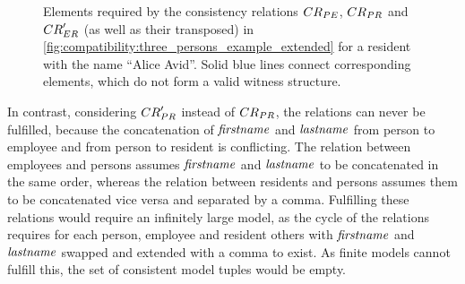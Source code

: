 \begin{figure}
    \centering
    
    \caption[Example for an intuitive notion of incompatibility]{Elements required by the consistency relations $\consistencyrelation{CR}{PE}$, $\consistencyrelation{CR}{PR}$ and $\consistencyrelation{CR}{ER}'$ (as well as their transposed) in \autoref{fig:compatibility:three_persons_example_extended} for a resident with the name \enquote{Alice Avid}. Solid blue lines connect corresponding elements, which do not form a valid witness structure.}
    \label{fig:compatibility:intuitive_incompatibility}
\end{figure}

In contrast, considering $\consistencyrelation{CR}{PR}'$ instead of $\consistencyrelation{CR}{PR}$, the relations can never be fulfilled, because the concatenation of $\mathit{firstname}$ and $\mathit{lastname}$ from person to employee and from person to resident is conflicting.
The relation between employees and persons assumes $\mathit{firstname}$ and $\mathit{lastname}$ to be concatenated in the same order, whereas the relation between residents and persons assumes them to be concatenated vice versa and separated by a comma.
Fulfilling these relations would require an infinitely large model, as the cycle of the relations requires for each person, employee and resident others with $\mathit{firstname}$ and $\mathit{lastname}$ swapped and extended with a comma to exist.
As finite models cannot fulfill this, the set of consistent model tuples would be empty.

